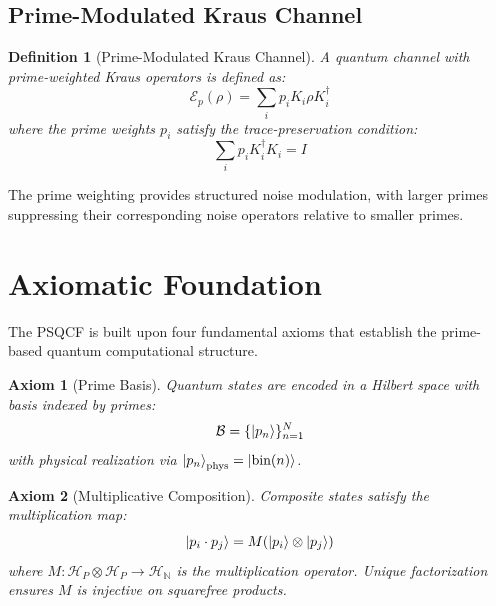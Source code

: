 \documentclass[12pt,a4paper]{article}
\newtheorem{definition}{Definition}[section]
\newtheorem{axiom}{Axiom}
\begin{document}
\subsection{Prime-Modulated Kraus Channel}

\begin{definition}[Prime-Modulated Kraus Channel]
\label{def:kraus}
A quantum channel with prime-weighted Kraus operators is defined as:
\begin{equation}
    \mathcal{E}_p(\rho) = \sum_i p_i K_i \rho K_i^\dagger
\end{equation}
where the prime weights $p_i$ satisfy the trace-preservation condition:
\begin{equation}
    \sum_i p_i K_i^\dagger K_i = I
\end{equation}
\end{definition}

The prime weighting provides structured noise modulation, with larger primes suppressing their corresponding noise operators relative to smaller primes.

\section{Axiomatic Foundation}
\label{sec:axioms}

The PSQCF is built upon four fundamental axioms that establish the prime-based quantum computational structure.

\begin{axiom}[Prime Basis]
\label{ax:basis}
Quantum states are encoded in a Hilbert space with basis indexed by primes:
\begin{equation}
    \mathcal{B} = \{\ket{p_n}\}_{n=1}^N
\end{equation}
with physical realization via $\ket{p_n}_{\text{phys}} = \ket{\text{bin}(n)}$.
\end{axiom}

\begin{axiom}[Multiplicative Composition]
\label{ax:multiplication}
Composite states satisfy the multiplication map:
\begin{equation}
    \ket{p_i \cdot p_j} = M(\ket{p_i} \otimes \ket{p_j})
\end{equation}
where $M: \mathcal{H}_P \otimes \mathcal{H}_P \to \mathcal{H}_{\mathbb{N}}$ is the multiplication operator. Unique factorization ensures $M$ is injective on squarefree products.
\end{axiom}
\end{document}
